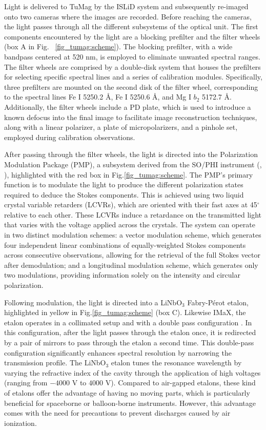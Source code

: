 Light is delivered to TuMag by the ISLiD system and subsequently re-imaged onto two cameras where the images are recorded. Before reaching the cameras, the light passes through all the different subsystems of the optical unit. The first components encountered by the light are a blocking prefilter and the filter wheels (box A in Fig. ~\ref{fig_tumag:scheme}). The blocking prefilter, with a wide bandpass centered at 520 nm, is employed to eliminate unwanted spectral ranges. The filter wheels  are comprised by a double-disk system \citep{filter-wheels} that houses the prefilters for selecting specific spectral lines and a series of calibration modules. Specifically, three prefilters are mounted on the second disk of the filter wheel, corresponding to the spectral lines Fe I 5250.2 \r{A}, Fe I 5250.6 \r{A}, and Mg I $b_2$ 5172.7 \r{A}. Additionally, the filter wheels include a PD plate, which is used to introduce a known defocus into the final image to facilitate image reconstruction techniques, along with a linear polarizer, a plate of micropolarizers, and a pinhole set, employed during calibration observations.

After passing through the filter wheels, the light is directed into the Polarization Modulation Package (PMP), a subsystem derived from the SO/PHI instrument (\citealt{pmp1}, \citealt{PHI}), highlighted with the red box in Fig.\ref{fig_tumag:scheme}. The PMP's primary function is to modulate the light to produce the different polarization states required to deduce the Stokes components. This is achieved using two liquid crystal variable retarders (LCVRs), which are oriented with their fast axes at 45$^\circ$ relative to each other. These LCVRs induce a retardance on the transmitted light that varies with the voltage applied across the crystals. The system can operate in two distinct modulation schemes: a vector modulation scheme, which generates four independent linear combinations of equally-weighted Stokes components across consecutive observations, allowing for the retrieval of the full Stokes vector after demodulation; and a longitudinal modulation scheme, which generates only two modulations, providing information solely on the intensity and circular polarization.

Following modulation, the light is directed into a LiNbO$_3$ Fabry-Pérot etalon, highlighted in yellow in Fig.\ref{fig_tumag:scheme} (box C). Likewise IMaX, the etalon operates in a collimated setup and with a double pass configuration \citep{etalon-doublepass}. In this configuration, after the light passes through the etalon once, it is redirected by a pair of mirrors to pass through the etalon a second time. This double-pass configuration significantly enhances spectral resolution by narrowing the transmission profile. The LiNbO$_3$ etalon tunes the resonance wavelength by varying the refractive index of the cavity through the application of high voltages (ranging from $-4000$ V to $4000$ V). Compared to air-gapped etalons, these kind of etalons offer the advantage of having no moving parts, which is particularly beneficial for spaceborne or balloon-borne instruments. However, this advantage comes with the need for precautions to prevent discharges caused by air ionization.

